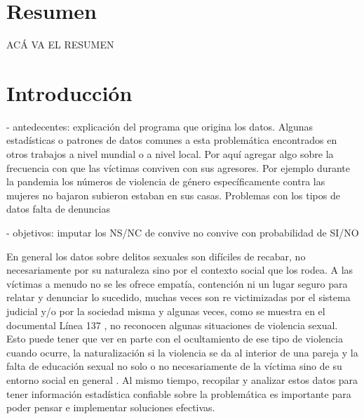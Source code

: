 \documentclass[10 pt]{article}
\begin{document}
\newpage


\section*{Resumen}


ACÁ VA EL RESUMEN


\section*{Introducción}\label{intro}

- antedecentes: explicación del programa que origina los datos. Algunas estadísticas o patrones de datos comunes a esta problemática encontrados en otros trabajos a nivel mundial o a nivel local.
Por aquí agregar algo sobre la frecuencia con que las víctimas conviven con sus agresores. Por ejemplo durante la pandemia los números de violencia de género específicamente contra las mujeres no bajaron subieron estaban en sus casas.
Problemas con los tipos de datos falta de denuncias

- objetivos: imputar los NS/NC de convive no convive con probabilidad de SI/NO  


En general los datos sobre delitos sexuales son difíciles de recabar, no necesariamente por su naturaleza sino por el contexto social que los rodea. A las víctimas a menudo no se les ofrece empatía, contención ni un lugar seguro para relatar y denunciar lo sucedido, muchas veces son re victimizadas por el sistema judicial y/o por la sociedad misma y algunas veces, como se muestra en el documental Línea 137 \citep{vasallo2020linea137}, no reconocen algunas situaciones de violencia sexual. Esto puede tener que ver en parte con el ocultamiento de ese tipo de violencia cuando ocurre, la naturalización si la violencia se da al interior de una pareja y la falta de educación sexual no solo o no necesariamente de la víctima sino de su entorno social en general \citep{contreras2016violencia}. Al mismo tiempo, recopilar y analizar estos datos para tener información estadística confiable sobre la problemática es importante para poder pensar e implementar soluciones efectivas.
\end{document}
